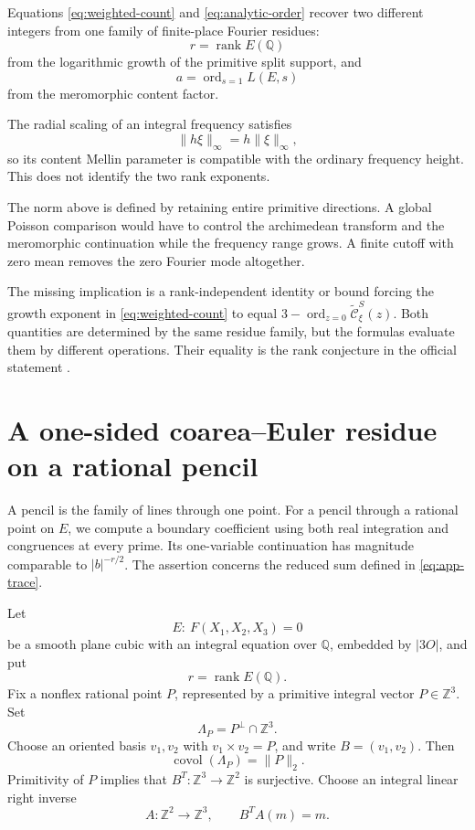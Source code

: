 \documentclass[11pt]{article}
\begin{document}
Equations \eqref{eq:weighted-count} and
\eqref{eq:analytic-order} recover two
different integers from one family of
finite-place Fourier residues:
\[
r=\operatorname{rank}E(\mathbb Q)
\]
from the logarithmic growth of the
primitive split support, and
\[
a=\operatorname{ord}_{s=1}L(E,s)
\]
from the meromorphic content factor.

The radial scaling of an integral
frequency satisfies
\[
\|h\xi\|_\infty=h\|\xi\|_\infty,
\]
so its content Mellin parameter is
compatible with the ordinary frequency
height. This does not identify the two
rank exponents.

The norm above is defined by retaining entire primitive directions.
A global Poisson comparison would have to control the archimedean
transform and the meromorphic continuation while the frequency range
grows. A finite cutoff with zero mean removes the zero Fourier mode
altogether.

The missing implication is a rank-independent identity or bound
forcing the growth exponent in \eqref{eq:weighted-count} to equal
$3-\operatorname{ord}_{z=0}\widetilde{\mathcal C}_\xi^S(z)$.
Both quantities are determined by the same residue family, but the
formulas evaluate them by different operations. Their equality is
the rank conjecture in the official statement \cite{Clay}.

\appendix
\section{A one-sided coarea--Euler residue on a rational pencil}
\label{app:coarea-euler}

A pencil is the family of lines through one point. For a pencil through
a rational point on $E$, we compute a boundary coefficient using both
real integration and congruences at every prime. Its one-variable
continuation has magnitude comparable to $|b|^{-r/2}$. The assertion
concerns the reduced sum defined in \eqref{eq:app-trace}.

Let
\[
E:\ F(X_1,X_2,X_3)=0
\]
be a smooth plane cubic with an integral equation over $\mathbb Q$, embedded by
$|3O|$, and put
\[
r=\operatorname{rank}E(\mathbb Q).
\]
Fix a nonflex rational point $P$, represented by a primitive
integral vector $P\in\mathbb Z^3$. Set
\[
\Lambda_P=P^\perp\cap\mathbb Z^3.
\]
Choose an oriented basis $v_1,v_2$ with
$v_1\times v_2=P$, and write $B=(v_1,v_2)$.
Then
\[
\operatorname{covol}(\Lambda_P)=\|P\|_2.
\]
Primitivity of $P$ implies that
$B^T:\mathbb Z^3\to\mathbb Z^2$ is surjective.
Choose an integral linear right inverse
\[
A:\mathbb Z^2\longrightarrow\mathbb Z^3,
\qquad B^TA(m)=m.
\]
\end{document}
